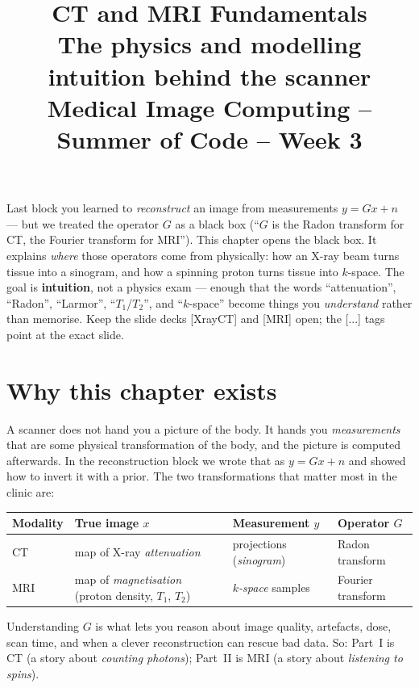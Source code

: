 \documentclass[11pt]{article}
\title{\textbf{CT and MRI Fundamentals}\\[2pt]
\large The physics and modelling intuition behind the scanner\\[6pt]
\normalsize Medical Image Computing -- Summer of Code -- Week 3}
\author{}
\date{}
\newcommand{\deck}[1]{\textsf{\small[#1]}}
\begin{document}
\maketitle
\vspace{-2.2em}

\begin{keybox}
Last block you learned to \emph{reconstruct} an image from measurements
$y=Gx+n$ --- but we treated the operator $G$ as a black box (``$G$ is the Radon
transform for CT, the Fourier transform for MRI''). This chapter opens the black
box. It explains \emph{where} those operators come from physically: how an X-ray
beam turns tissue into a sinogram, and how a spinning proton turns tissue into
$k$-space. The goal is \textbf{intuition}, not a physics exam --- enough that the
words ``attenuation'', ``Radon'', ``Larmor'', ``$T_1$/$T_2$'', and ``$k$-space''
become things you \emph{understand} rather than memorise. Keep the slide decks
\deck{XrayCT} and \deck{MRI} open; the \deck{...} tags point at the exact slide.
\end{keybox}

\tableofcontents
\bigskip

\section{Why this chapter exists}

A scanner does not hand you a picture of the body. It hands you
\emph{measurements} that are some physical transformation of the body, and the
picture is computed afterwards. In the reconstruction block we wrote that as
$y = Gx + n$ and showed how to invert it with a prior. The two transformations
that matter most in the clinic are:
\begin{center}
\begin{tabular}{@{}llll@{}}
\toprule
Modality & True image $x$ & Measurement $y$ & Operator $G$ \\
\midrule
CT  & map of X-ray \emph{attenuation} & projections (\emph{sinogram}) & Radon transform \\
MRI & map of \emph{magnetisation} (proton density, $T_1$, $T_2$) & \emph{$k$-space} samples & Fourier transform \\
\bottomrule
\end{tabular}
\end{center}
Understanding $G$ is what lets you reason about image quality, artefacts, dose,
scan time, and when a clever reconstruction can rescue bad data. So: Part~I is
CT (a story about \emph{counting photons}); Part~II is MRI (a story about
\emph{listening to spins}).
\end{document}
